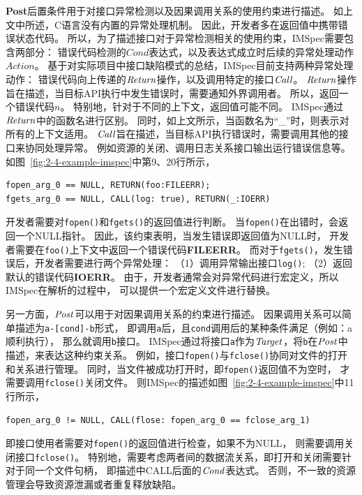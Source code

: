 \textbf{Post}后置条件用于对接口异常检测以及因果调用关系的使用约束进行描述。
如上文中所述，C语言没有内置的异常处理机制。
因此，开发者多在返回值中携带错误状态代码。
所以，为了描述接口对于异常检测相关的使用约束，IMSpec需要包含两部分：
错误代码检测的$\mathit{Cond}$表达式，以及表达式成立时后续的异常处理动作$\mathit{Action}$。
基于对实际项目中接口缺陷模式的总结，IMSpec目前支持两种异常处理动作：
错误代码向上传递的$\mathit{Return}$操作，以及调用特定的接口$\mathit{Call}$。
$\mathit{Return}$操作旨在描述，当目标API执行中发生错误时，需要通知外界调用者。
所以，返回一个错误代码$n$。
特别地，针对于不同的上下文，返回值可能不同。
IMSpec通过$\mathit{Return}$中的函数名进行区别。
同时，如上文所示，当函数名为“\_”时，则表示对所有的上下文适用。
$\mathit{Call}$旨在描述，当目标API执行错误时，需要调用其他的接口来协同处理异常。
例如资源的关闭、调用日志关系接口输出运行错误信息等。
如图~\ref{fig:2-4-example-imspec}中第9、20行所示，
\begin{lstlisting}[language={[ANSI]C},
basicstyle=\linespread{0.8}\listingsfont,
numbers=none,
xleftmargin=.15\textwidth]
fopen_arg_0 == NULL, RETURN(foo:FILEERR);
fgets_arg_0 == NULL, CALL(log: true), RETURN(_:IOERR)
\end{lstlisting}
开发者需要对\texttt{fopen()}和\texttt{fgets()}的返回值进行判断。
当\texttt{fopen()}在出错时，会返回一个NULL指针。
因此，该约束表明，当发生错误即返回值为NULL时，
开发者需要在\texttt{foo()}上下文中返回一个错误代码\textbf{FILEERR}。
而对于\texttt{fgets()}，发生错误后，开发者需要进行两个异常处理：
（1）调用异常输出接口\texttt{log()};
（2）返回默认的错误代码\textbf{IOERR}。
由于，开发者通常会对异常代码进行宏定义，所以IMSpec在解析的过程中，
可以提供一个宏定义文件进行替换。

另一方面，$\mathit{Post}$可以用于对因果调用关系的约束进行描述。
因果调用关系可以简单描述为\texttt{a-[cond]-b}形式，
即调用\texttt{a}后，且\texttt{cond}调用后的某种条件满足（例如：a顺利执行），
那么就调用\texttt{b}接口。
IMSpec通过将接口\texttt{a}作为$\mathit{Target}$，将\texttt{b}在$\mathit{Post}$中描述，来表达这种约束关系。
例如，接口\texttt{fopen()}与\texttt{fclose()}协同对文件的打开和关系进行管理。
同时，当文件被成功打开时，即\texttt{fopen()}返回值不为空时，
才需要调用\texttt{fclose()}关闭文件。
则IMSpec的描述如图~\ref{fig:2-4-example-imspec}中11行所示，
\begin{lstlisting}[language={[ANSI]C},
basicstyle=\linespread{0.8}\listingsfont,
numbers=none,
xleftmargin=.15\textwidth]
fopen_arg_0 != NULL, CALL(flose: fopen_arg_0 == fclose_arg_1)
\end{lstlisting}
即接口使用者需要对\texttt{fopen()}的返回值进行检查，如果不为NULL，
则需要调用关闭接口\texttt{fclose()}。
特别地，需要考虑两者间的数据流关系，即打开和关闭需要针对于同一个文件句柄，
即描述中CALL后面的$\mathit{Cond}$表达式。
否则，不一致的资源管理会导致资源泄漏或者重复释放缺陷。


